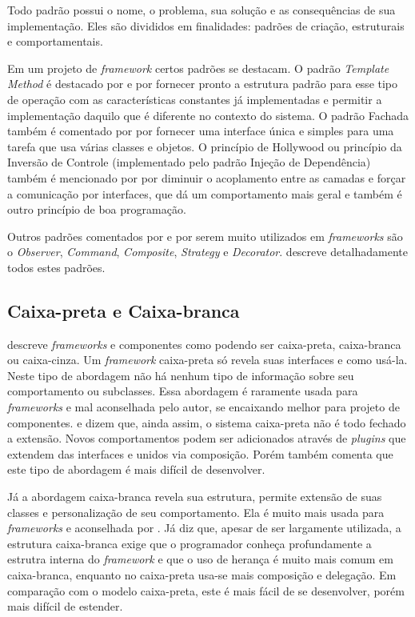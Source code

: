 Todo padrão possui o nome, o problema, sua solução e as consequências de sua implementação. Eles são divididos em finalidades: padrões de criação, estruturais e comportamentais.

Em um projeto de \textit{framework} certos padrões se destacam. O padrão \textit{Template Method} é destacado por \cite{Larman2005} e \cite{Fayad1999} por fornecer pronto a estrutura padrão para esse tipo de operação com as características constantes já implementadas e permitir a implementação daquilo que é diferente no contexto do sistema. O padrão Fachada também é comentado por \cite{Larman2005} por fornecer uma interface única e simples para uma tarefa que usa várias classes e objetos. O princípio de Hollywood ou princípio da Inversão de Controle (implementado pelo padrão Injeção de Dependência) também é mencionado por \cite{Larman2005} por diminuir o acoplamento entre as camadas e forçar a comunicação por interfaces, que dá um comportamento mais geral e também é outro princípio de boa programação.

Outros padrões comentados por \cite{Larman2005} e \cite{Szyperski2002} por serem muito utilizados em \textit{frameworks} são o \textit{Observer}, \textit{Command}, \textit{Composite}, \textit{Strategy} e \textit{Decorator}. \cite{Gamma1995} descreve detalhadamente todos estes padrões.

\subsection{Caixa-preta e Caixa-branca}

\cite{Szyperski2002} descreve \textit{frameworks} e componentes como podendo ser caixa-preta, caixa-branca ou caixa-cinza. Um \textit{framework} caixa-preta só revela suas interfaces e como usá-la. Neste tipo de abordagem não há nenhum tipo de informação sobre seu comportamento ou subclasses. Essa abordagem é raramente usada para \textit{frameworks} e mal aconselhada pelo autor, se encaixando melhor para projeto de componentes. \cite{Szyperski2002} e \cite{Fayad1999} dizem que, ainda assim, o sistema caixa-preta não é todo fechado a extensão. Novos comportamentos podem ser adicionados através de \textit{plugins} que extendem das interfaces e unidos via composição. Porém \cite{Fayad1999} também comenta que este tipo de abordagem é mais difícil de desenvolver.

Já a abordagem caixa-branca revela sua estrutura, permite extensão de suas classes e personalização de seu comportamento. Ela é muito mais usada para \textit{frameworks} e aconselhada por \cite{Szyperski2002}. Já \cite{Fayad1999} diz que, apesar de ser largamente utilizada, a estrutura caixa-branca exige que o programador conheça profundamente a estrutra interna do \textit{framework} e que o uso de herança é muito mais comum em caixa-branca, enquanto no caixa-preta usa-se mais composição e delegação. Em comparação com o modelo caixa-preta, este é mais fácil de se desenvolver, porém mais difícil de estender.

